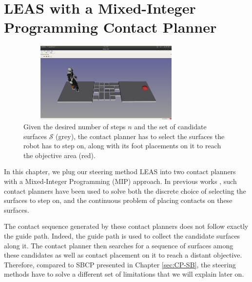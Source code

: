 

\chapter{LEAS with a Mixed-Integer Programming Contact Planner}
\label{sec:CP-SL1M}
\minitoc
\bigskip

\begin{figure}[ht]
    \centering
    \captionsetup[subfigure]{justification=centering}
    \includegraphics[trim={8cm 7cm 7.5cm 9cm},clip,width=0.8\textwidth,height=4cm]{Figures/Chapter_MIP_SL1M/rubbles/rubbles_empty.png}
    \caption{Given the desired number of steps $n$ and the set of candidate surfaces $\mathcal{S}$ (grey), the contact planner has to select the surfaces the robot has to step on, along with its foot placements on it to reach the objective area (red).\label{fig:rubbles:empty}}
\end{figure}

In this chapter, we plug our steering method LEAS into two contact planners with a Mixed-Integer Programming (MIP) approach.
In previous works \cite{deits2014FootPlanMI, sl1m_v2}, such contact planners have been used to solve both the discrete choice of selecting the surfaces to step on, and the continuous problem of placing contacts on these surfaces.

The contact sequence generated by these contact planners does not follow exactly the guide path.
Indeed, the guide path is used to collect the candidate surfaces along it.
The contact planner then searches for a sequence of surfaces among these candidates as well as contact placement on it to reach a distant objective.
Therefore, compared to SBCP presented in Chapter \ref{sec:CP-SB}, the steering methods have to solve a different set of limitations that we will explain later on.


